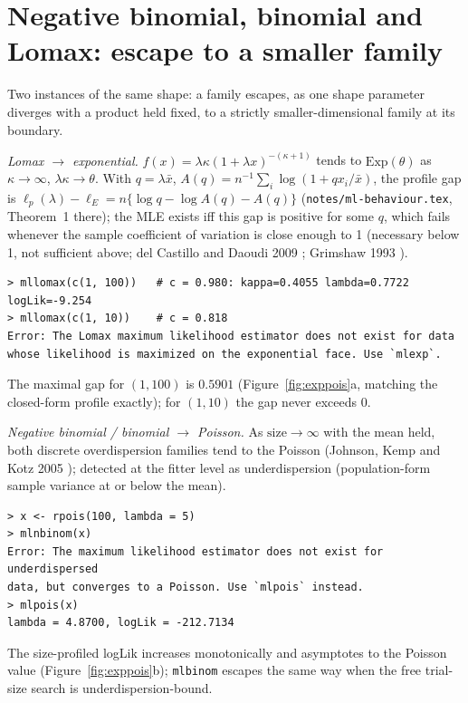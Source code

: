 \documentclass[11pt]{article}
\newcommand{\code}[1]{\texttt{#1}}
\theoremstyle{plain}
\theoremstyle{definition}
\theoremstyle{remark}
\begin{document}
\section{Negative binomial, binomial and Lomax: escape to a smaller family}
\label{sec:exppois}

Two instances of the same shape: a family escapes, as one shape parameter
diverges with a product held fixed, to a strictly smaller-dimensional
family at its boundary.

\emph{Lomax $\to$ exponential.} $f(x)=\lambda\kappa(1+\lambda x)^{-(\kappa+1)}$
tends to $\mathrm{Exp}(\theta)$ as $\kappa\to\infty$, $\lambda\kappa\to\theta$.
With $q=\lambda\bar x$, $A(q)=n^{-1}\sum_i\log(1+qx_i/\bar x)$, the profile
gap is $\ell_p(\lambda)-\ell_E=n\{\log q-\log A(q)-A(q)\}$
(\code{notes/ml-behaviour.tex}, Theorem~1 there); the MLE exists iff this
gap is positive for some $q$, which fails whenever the sample coefficient
of variation is close enough to 1 (necessary below 1, not sufficient
above; del Castillo and Daoudi 2009 \cite{delcastillo2009}; Grimshaw 1993
\cite{grimshaw1993}).

\begin{verbatim}
> mllomax(c(1, 100))   # c = 0.980: kappa=0.4055 lambda=0.7722 logLik=-9.254
> mllomax(c(1, 10))    # c = 0.818
Error: The Lomax maximum likelihood estimator does not exist for data
whose likelihood is maximized on the exponential face. Use `mlexp`.
\end{verbatim}
The maximal gap for $(1,100)$ is $0.5901$ (Figure~\ref{fig:exppois}a,
matching the closed-form profile exactly); for $(1,10)$ the gap never
exceeds $0$.

\emph{Negative binomial / binomial $\to$ Poisson.} As
$\mathrm{size}\to\infty$ with the mean held, both discrete overdispersion
families tend to the Poisson (Johnson, Kemp and Kotz 2005
\cite{jkk2005}); detected at the fitter level as underdispersion
(population-form sample variance at or below the mean).

\begin{verbatim}
> x <- rpois(100, lambda = 5)
> mlnbinom(x)
Error: The maximum likelihood estimator does not exist for underdispersed
data, but converges to a Poisson. Use `mlpois` instead.
> mlpois(x)
lambda = 4.8700, logLik = -212.7134
\end{verbatim}
The size-profiled logLik increases monotonically and asymptotes to the
Poisson value (Figure~\ref{fig:exppois}b); \code{mlbinom} escapes the same
way when the free trial-size search is underdispersion-bound.
\end{document}

